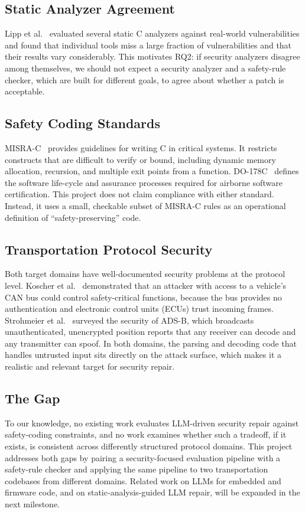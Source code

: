 \documentclass[12pt]{IEEEtran}
\begin{document}
\subsection{Static Analyzer Agreement}
Lipp et al.~\cite{lipp2022static} evaluated several static C analyzers against real-world vulnerabilities and found that individual tools miss a large fraction of vulnerabilities and that their results vary considerably. This motivates RQ2: if security analyzers disagree among themselves, we should not expect a security analyzer and a safety-rule checker, which are built for different goals, to agree about whether a patch is acceptable.

\subsection{Safety Coding Standards}
MISRA-C~\cite{misra2012} provides guidelines for writing C in critical systems. It restricts constructs that are difficult to verify or bound, including dynamic memory allocation, recursion, and multiple exit points from a function. DO-178C~\cite{do178c} defines the software life-cycle and assurance processes required for airborne software certification. This project does not claim compliance with either standard. Instead, it uses a small, checkable subset of MISRA-C rules as an operational definition of ``safety-preserving'' code.

\subsection{Transportation Protocol Security}
Both target domains have well-documented security problems at the protocol level. Koscher et al.~\cite{koscher2010experimental} demonstrated that an attacker with access to a vehicle's CAN bus could control safety-critical functions, because the bus provides no authentication and electronic control units (ECUs) trust incoming frames. Strohmeier et al.~\cite{strohmeier2015adsb} surveyed the security of ADS-B, which broadcasts unauthenticated, unencrypted position reports that any receiver can decode and any transmitter can spoof. In both domains, the parsing and decoding code that handles untrusted input sits directly on the attack surface, which makes it a realistic and relevant target for security repair.

\subsection{The Gap}
To our knowledge, no existing work evaluates LLM-driven security repair against safety-coding constraints, and no work examines whether such a tradeoff, if it exists, is consistent across differently structured protocol domains. This project addresses both gaps by pairing a security-focused evaluation pipeline with a safety-rule checker and applying the same pipeline to two transportation codebases from different domains. Related work on LLMs for embedded and firmware code, and on static-analysis-guided LLM repair, will be expanded in the next milestone.
\end{document}
